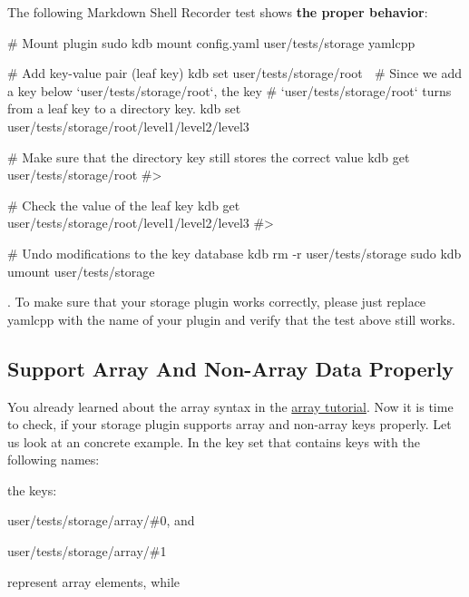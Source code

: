 The following Markdown Shell Recorder test shows {\bfseries the proper behavior}\+:


\begin{DoxyCode}
# Mount plugin
sudo kdb mount config.yaml user/tests/storage yamlcpp

# Add key-value pair (leaf key)
kdb set user/tests/storage/root 🐓
# Since we add a key below `user/tests/storage/root`, the key
# `user/tests/storage/root` turns from a leaf key to a directory key.
kdb set user/tests/storage/root/level1/level2/level3 🐣

# Make sure that the directory key still stores the correct value
kdb get user/tests/storage/root
#> 🐓

# Check the value of the leaf key
kdb get user/tests/storage/root/level1/level2/level3
#> 🐣

# Undo modifications to the key database
kdb rm -r user/tests/storage
sudo kdb umount user/tests/storage
\end{DoxyCode}


. To make sure that your storage plugin works correctly, please just replace {\ttfamily yamlcpp} with the name of your plugin and verify that the test above still works.

\subsection*{Support Array And Non-\/\+Array Data Properly}

You already learned about the array syntax in the \hyperlink{doc_tutorials_arrays_md}{array tutorial}. Now it is time to check, if your storage plugin supports array and non-\/array keys properly. Let us look at an concrete example. In the key set that contains keys with the following names\+:




the keys\+:


\begin{DoxyItemize}
\item {\ttfamily user/tests/storage/array/\#0}, and
\item {\ttfamily user/tests/storage/array/\#1}
\end{DoxyItemize}

represent array elements, while


